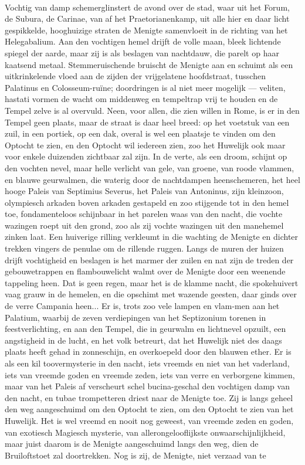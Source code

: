 \documentclass[a4paper, 12pt, oneside, dutch]{article}
\begin{document}
\paragraph{}
Vochtig van damp schemerglinstert de avond over de stad, waar uit het Forum, de Subura, de Carinae, van af het Praetorianenkamp, uit alle hier en daar licht gespikkelde, hooghuizige straten de Menigte samenvloeit in de richting van het Helegabalium. Aan den vochtigen hemel drijft de volle maan, bleek lichtende spiegel der aarde, maar zij is als beslagen van nachtdauw, die parelt op haar kaatsend metaal. Stemmeruischende bruischt de Menigte aan en schuimt als een uitkrinkelende vloed aan de zijden der vrijgelatene hoofdstraat, tusschen Palatinus en Colosseum-ruïne; doordringen is al niet meer mogelijk --- veliten, hastati vormen de wacht om middenweg en tempeltrap vrij te houden en de Tempel zelve is al overvuld. Neen, voor allen, die zien willen in Rome, is er in den Tempel geen plaats, maar de straat is daar heel breed: op het voetstuk van een zuil, in een portiek, op een dak, overal is wel een plaatsje te vinden om den Optocht te zien, en den Optocht wil iedereen zien, zoo het Huwelijk ook maar voor enkele duizenden zichtbaar zal zijn. In de verte, als een droom, schijnt op den vochten nevel, maar helle verlicht van gele, van groene, van roode vlammen, en blauwe geurwalmen, die waterig door de nachtdampen heenschemeren, het heel hooge Paleis van Septimius Severus, het Paleis van Antoninus, zijn kleinzoon, olympiesch arkaden boven arkaden gestapeld en zoo stijgende tot in den hemel toe, fondamenteloos schijnbaar in het parelen waas van den nacht, die vochte wazingen roept uit den grond, zoo als zij vochte wazingen uit den manehemel zinken laat. Een huiverige rilling verkleumt in die wachting de Menigte en dichter trekken vingers de penulae om de rillende ruggen. Langs de muren der huizen drijft vochtigheid en beslagen is het marmer der zuilen en nat zijn de treden der gebouwetrappen en flambouwelicht walmt over de Menigte door een weenende tappeling heen. Dat is geen regen, maar het is de klamme nacht, die spokehuivert vaag grauw in de hemelen, en die opschimt met wazende geesten, daar ginds over de verre Campania heen... Er is, trots zoo vele lampen en vlam-men aan het Palatium, waarbij de zeven verdiepingen van het Septizonium torenen in feestverlichting, en aan den Tempel, die in geurwalm en lichtnevel opzuilt, een angstigheid in de lucht, en het volk betreurt, dat het Huwelijk niet des daags plaats heeft gehad in zonneschijn, en overkoepeld door den blauwen ether. Er is als een kil toovermysterie in den nacht, iets vreemds en niet van het vaderland, iets van vreemde goden en vreemde zeden, iets van verre en verborgene kimmen, maar van het Paleis af verscheurt schel bucina-geschal den vochtigen damp van den nacht, en tubae trompetteren driest naar de Menigte toe. Zij is langs geheel den weg aangeschuimd om den Optocht te zien, om den Optocht te zien van het Huwelijk. Het is wel vreemd en nooit nog geweest, van vreemde zeden en goden, van exotiesch Magiesch mysterie, van allerongelooflijkste onwaarschijnlijkheid, maar juist daarom is de Menigte aangeschuimd langs den weg, dien de Bruiloftstoet zal doortrekken. Nog is zij, de Menigte, niet verzaad van te 
\end{document}
